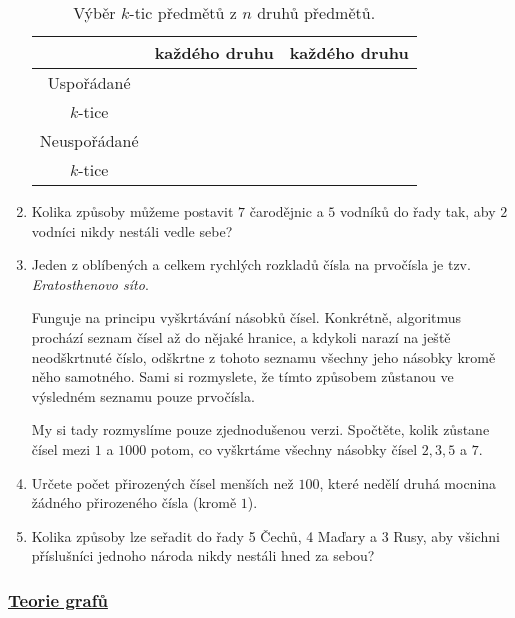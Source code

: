 \begin{enumerate}
\begin{table}[h]
\begin{tabular}{c|c|c}
    & každého druhu & každého druhu\\
    \midrule
    Uspořádané& &\\
    $k$-tice& &\\
    \midrule
    Neuspořádané & &\\
    $k$-tice& &
   \end{tabular}
   \caption{Výběr $k$-tic předmětů z $n$ druhů předmětů.}
   \label{table:vyber-k-z-n-2}
  \end{table}
 \item Kolika způsoby můžeme postavit $7$ čarodějnic a $5$ vodníků do řady tak,
  aby $2$ vodníci nikdy nestáli vedle sebe? \item Jeden z oblíbených a celkem
  rychlých rozkladů čísla na prvočísla je tzv. \emph{Eratosthenovo síto}.
 
  Funguje na principu vyškrtávání násobků čísel. Konkrétně, algoritmus prochází
  seznam čísel až do nějaké hranice, a kdykoli narazí na ještě neodškrtnuté
  číslo, odškrtne z tohoto seznamu všechny jeho násobky kromě něho samotného.
  Sami si rozmyslete, že tímto způsobem zůstanou ve výsledném seznamu pouze
  prvočísla.

  My si tady rozmyslíme pouze zjednodušenou verzi. Spočtěte, kolik zůstane
  čísel mezi $1$ a $1000$ potom, co vyškrtáme všechny násobky čísel $2,3,5$ a
  $7$.
 \item Určete počet přirozených čísel menších než $100$, které nedělí druhá
  mocnina žádného přirozeného čísla (kromě $1$).
 \item Kolika způsoby lze seřadit do řady 5 Čechů, 4 Maďary a 3 Rusy, aby
  všichni příslušníci jednoho národa nikdy nestáli hned za sebou?
\end{enumerate}

\subsubsection*{\hyperref[sec:teorie-grafu]{Teorie grafů}}

